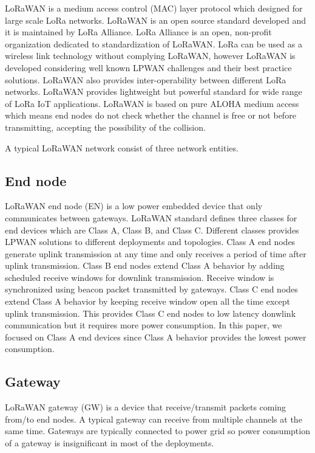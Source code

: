 \documentclass[conference]{IEEEtran}
\begin{document}
\par LoRaWAN is a medium access control (MAC) layer protocol which designed for large scale LoRa networks. LoRaWAN is an open source standard developed and it is maintained by LoRa Alliance. LoRa Alliance is an open, non-profit organization dedicated to standardization of LoRaWAN. LoRa can be used as a wireless link technology without complying LoRaWAN, however LoRaWAN is developed considering well known LPWAN challenges and their best practice solutions. LoRaWAN also provides inter-operability between different LoRa networks. LoRaWAN provides lightweight but powerful standard for wide range of LoRa IoT applications.  LoRaWAN is based on pure ALOHA medium access which means end nodes do not check whether the channel is free or not before transmitting, accepting the possibility of the collision.

\par A typical LoRaWAN network consist of three network entities.

\subsection{End node}
\par LoRaWAN end node (EN) is a low power embedded device that only communicates between gateways. LoRaWAN standard defines three classes for end devices which are Class A, Class B, and Class C. Different classes provides LPWAN solutions to different deployments and topologies. Class A end nodes generate uplink transmission at any time and only receives a period of time after uplink transmission. Class B end nodes extend Class A behavior by adding scheduled receive windows for downlink transmission. Receive window is synchronized using beacon packet transmitted by gateways. Class C end nodes extend Class A behavior by keeping receive window open all the time except uplink transmission. This provides Class C end nodes to low latency donwlink communication but it requires more power consumption. In this paper, we focused on Class A end devices since Class A behavior provides the lowest power consumption.

\subsection{Gateway}
\par LoRaWAN gateway (GW) is a device that receive/transmit packets coming from/to end nodes. A typical gateway can receive from multiple channels at the same time. Gateways are typically connected to power grid so power consumption of a gateway is insignificant in most of the deployments.
\end{document}
